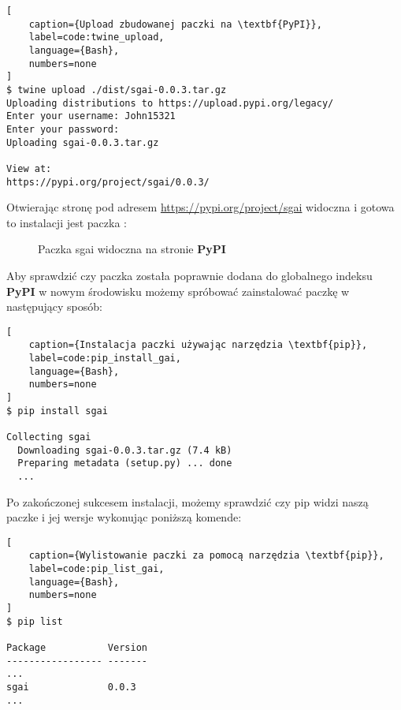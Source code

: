 \begin{onepage}
    \begin{lstlisting}[
    caption={Upload zbudowanej paczki na \textbf{PyPI}},
    label=code:twine_upload,
    language={Bash},
    numbers=none
]
$ twine upload ./dist/sgai-0.0.3.tar.gz
Uploading distributions to https://upload.pypi.org/legacy/
Enter your username: John15321
Enter your password:
Uploading sgai-0.0.3.tar.gz

View at:
https://pypi.org/project/sgai/0.0.3/
    \end{lstlisting}
\end{onepage}

\clearpage

Otwierając stronę pod adresem \url{https://pypi.org/project/sgai} widoczna i gotowa to instalacji jest paczka :

\begin{figure}[h]
    \centering
    \caption{Paczka sgai widoczna na stronie \textbf{PyPI}}
    \label{img:sgai_on_pypi}
\end{figure}

Aby sprawdzić czy paczka została poprawnie dodana do globalnego indeksu \textbf{PyPI} w nowym środowisku możemy spróbować zainstalować paczkę  w następujący sposób:

\begin{onepage}
    \begin{lstlisting}[
    caption={Instalacja paczki używając narzędzia \textbf{pip}},
    label=code:pip_install_gai,
    language={Bash},
    numbers=none
]
$ pip install sgai

Collecting sgai
  Downloading sgai-0.0.3.tar.gz (7.4 kB)
  Preparing metadata (setup.py) ... done
  ...
\end{lstlisting}
\end{onepage}

Po zakończonej sukcesem instalacji, możemy sprawdzić czy pip widzi naszą paczke i jej wersje wykonując poniższą komende:

\begin{onepage}
    \begin{lstlisting}[
    caption={Wylistowanie paczki za pomocą narzędzia \textbf{pip}},
    label=code:pip_list_gai,
    language={Bash},
    numbers=none
]
$ pip list

Package           Version
----------------- -------
...
sgai              0.0.3
...
\end{lstlisting}
\end{onepage}



